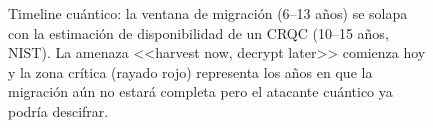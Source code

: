\begin{figure}[htbp]
\begin{tikzpicture}[
  >={Stealth},
  x=1.05cm,
  font=\footnotesize,
]
\end{tikzpicture}
\caption{Timeline cuántico: la ventana de migración (6--13 años) se solapa con la estimación de disponibilidad de un CRQC (10--15 años, NIST). La amenaza <<harvest now, decrypt later>> comienza hoy y la zona crítica (rayado rojo) representa los años en que la migración aún no estará completa pero el atacante cuántico ya podría descifrar.}
\label{fig:quantum_timeline}
\end{figure}
